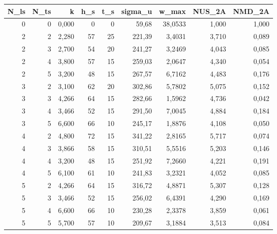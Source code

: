 \begin{tabular}{rrrrrrrrr}
\toprule
N_ls & N_ts & k & h_s & t_s & sigma_u & w_max & NUS_2A & NMD_2A \\ \hline
\midrule
0 & 0 & 0,000 & 0 & 0 & 59,68 & 38,0533 & 1,000 & 1,000 \\ \hline 
2 & 2 & 2,280 & 57 & 25 & 221,39 & 3,4031 & 3,710 & 0,089 \\ \hline
2 & 3 & 2,700 & 54 & 20 & 241,27 & 3,2469 & 4,043 & 0,085 \\ \hline
2 & 4 & 3,800 & 57 & 15 & 259,03 & 2,0647 & 4,340 & 0,054 \\ \hline
2 & 5 & 3,200 & 48 & 15 & 267,57 & 6,7162 & 4,483 & 0,176 \\ \hline
3 & 2 & 3,100 & 62 & 20 & 302,86 & 5,7802 & 5,075 & 0,152 \\ \hline
3 & 3 & 4,266 & 64 & 15 & 282,66 & 1,5962 & 4,736 & 0,042 \\ \hline
3 & 4 & 3,466 & 52 & 15 & 291,50 & 7,0045 & 4,884 & 0,184 \\ \hline
3 & 5 & 6,600 & 66 & 10 & 245,17 & 1,8876 & 4,108 & 0,050 \\ \hline
4 & 2 & 4,800 & 72 & 15 & 341,22 & 2,8165 & 5,717 & 0,074 \\ \hline
4 & 3 & 3,866 & 58 & 15 & 310,51 & 5,5516 & 5,203 & 0,146 \\ \hline
4 & 4 & 3,200 & 48 & 15 & 251,92 & 7,2660 & 4,221 & 0,191 \\ \hline
4 & 5 & 6,100 & 61 & 10 & 241,83 & 3,2321 & 4,052 & 0,085 \\ \hline
5 & 2 & 4,266 & 64 & 15 & 316,72 & 4,8871 & 5,307 & 0,128 \\ \hline
5 & 3 & 3,466 & 52 & 15 & 256,02 & 6,4391 & 4,290 & 0,169 \\ \hline
5 & 4 & 6,600 & 66 & 10 & 230,28 & 2,3378 & 3,859 & 0,061 \\ \hline
5 & 5 & 5,700 & 57 & 10 & 209,67 & 3,1884 & 3,513 & 0,084 \\ \hline
\bottomrule
\end{tabular}
